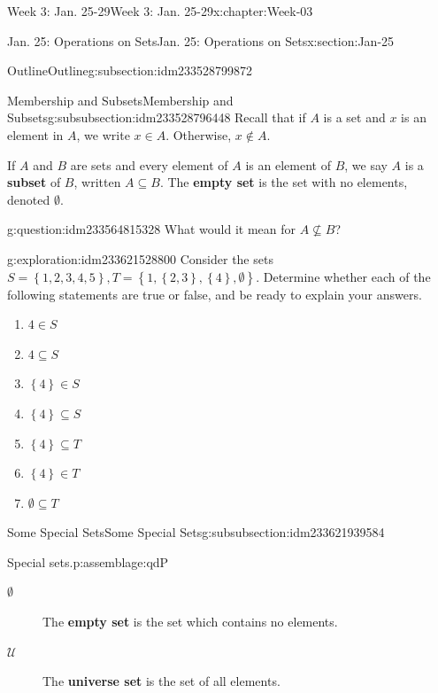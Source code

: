 \documentclass[oneside,10pt,]{book}
\newcommand{\terminology}[1]{\textbf{#1}}
\numberwithin{equation}{section}
\newcommand{\set}[1]{\left\{ {#1} \right\}}
\def\U{{\mathcal U}}
\newcommand{\U}{\mathcal U}
\begin{document}
\begin{chapterptx}{Week 3: Jan. 25-29}{}{Week 3: Jan. 25-29}{}{}{x:chapter:Week-03}
\begin{sectionptx}{Jan. 25: Operations on Sets}{}{Jan. 25: Operations on Sets}{}{}{x:section:Jan-25}
\begin{subsectionptx}{Outline}{}{Outline}{}{}{g:subsection:idm233528799872}
\typeout{************************************************}
%
\begin{subsubsectionptx}{Membership and Subsets}{}{Membership and Subsets}{}{}{g:subsubsection:idm233528796448}
Recall that if \(A\) is a set and \(x\) is an element in \(A\), we write \(x\in A\). Otherwise, \(x\notin A\).%
\par
If \(A\) and \(B\) are sets and every element of \(A\) is an element of \(B\), we say \(A\) is a \terminology{subset} of \(B\), written \(A\subseteq B\). The \terminology{empty set} is the set with no elements, denoted \(\emptyset\).%
\begin{question}{}{g:question:idm233564815328}%
What would it mean for \(A\not\subseteq B\)?%
\end{question}
\begin{exploration}{}{g:exploration:idm233621528800}%
Consider the sets \(S = \set{1,2,3,4,5}, T = \set{1,\set{2,3},\set{4},\emptyset}\). Determine whether each of the following statements are true or false, and be ready to explain your answers. %
%
\begin{enumerate}
\item{}\(\displaystyle 4 \in S\)%
\item{}\(\displaystyle 4\subseteq S\)%
\item{}\(\displaystyle \set{4}\in S\)%
\item{}\(\displaystyle \set{4}\subseteq S\)%
\item{}\(\displaystyle \set{4}\subseteq T\)%
\item{}\(\displaystyle \set{4}\in T\)%
\item{}\(\displaystyle \emptyset\subseteq T\)%
\end{enumerate}
\end{exploration}%
\end{subsubsectionptx}
%
%
\typeout{************************************************}
\typeout{************************************************}
%
\begin{subsubsectionptx}{Some Special Sets}{}{Some Special Sets}{}{}{g:subsubsection:idm233621939584}
\begin{assemblage}{Special sets.}{p:assemblage:qdP}%
%
\begin{description}
\item[{\(\emptyset\)}]The \terminology{empty set} is the set which contains no elements. \label{g:notation:idm233622244224}%
\item[{\(\U\)}]The \terminology{universe set} is the set of all elements. \label{g:notation:idm233622437504}%

\end{description}
\end{assemblage}
\end{subsubsectionptx}
\end{subsectionptx}
\end{sectionptx}
\end{chapterptx}
\end{document}

